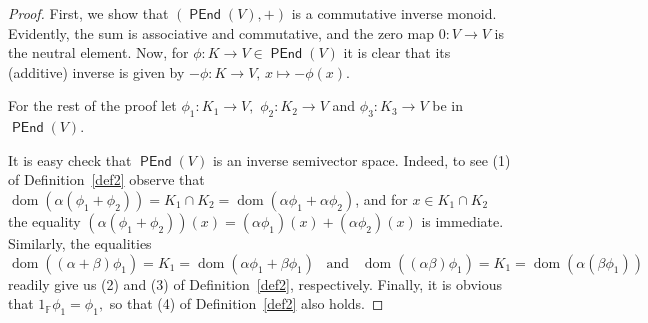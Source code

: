 \documentclass{amsart}
\newcommand{\0}{{\vartheta}}
\theoremstyle{definition}
\theoremstyle{remark}
\numberwithin{equation}{section}
\newtheorem*{Theorem A}{\textbf{Theorem A}}
\newtheorem*{Corollary E}{\textbf{Corollary E}}
\newtheorem*{Corollary F}{\textbf{Corollary F}}
\newtheorem*{Theorem B}{\textbf{Theorem B}}
\newtheorem*{Theorem C}{\textbf{Theorem C}}
\newtheorem*{Theorem D}{\textbf{Theorem B}}
\newtheorem*{p a}{\textbf{Proof of  Theorem A}}
\newtheorem*{p b}{\textbf{Proof of Theorem B}}
\newtheorem*{p c}{\textbf{Proof of  Theorem C}}
\newtheorem*{p d}{\textbf{Proof of  Theorem D}}
\DeclareMathOperator{\dom}{dom}
\DeclareMathOperator{\pen}{\textsf{PEnd}}
\begin{document}
\begin{proof}
First, we show that $(\pen(V),+)$ is a commutative inverse monoid. Evidently, the sum is associative and commutative, and the  zero map $0: V\to V$ is the neutral element. Now, for $\phi:K\to V\in \pen(V)$  it is clear that its (additive) inverse is given by $-\phi:K\to V, \, x\mapsto -\phi(x)$. 

 For the rest of the proof let  $\phi_1: K_1\to V,$ $\phi_2: K_2\to V$ and $\phi_3: K_3 \to V$  be in  $\pen(V).$

  It is easy check that $\pen(V)$ is an inverse semivector space. Indeed,  to see (1) of Definition~\ref{def2}  observe that $\dom (\alpha  (\phi_1+\phi_2))=K_1\cap K_2=\dom (\alpha  \phi_1+ \alpha  \phi_2)$, and for $x\in K_1\cap K_2$ the equality  $(\alpha  (\phi_1+\phi_2))(x)=(\alpha  \phi_1)(x)+(\alpha \phi_2)(x)$ is immediate. Similarly, the equalities 
$$\dom ((\alpha +\beta)  \phi_1)=K_1=\dom (\alpha  \phi_1+ \beta  \phi_1) \;\;\; \text{and} \;\;\; 
\dom ((\alpha \beta)  \phi_1)=K_1=\dom (\alpha (  \beta  \phi_1))$$ readily give us (2) and (3) of Definition~\ref{def2}, respectively. Finally, it is obvious that $1_{\mathbb F}\phi_1=\phi_1,$ so that  (4) of Definition~\ref{def2} also holds.

		

\end{proof}
\end{document}
